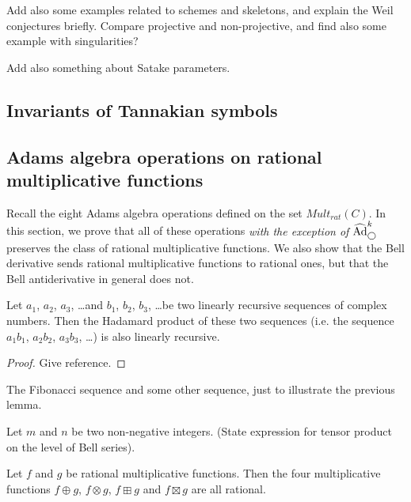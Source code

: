 Add also some examples related to schemes and skeletons, and explain the Weil conjectures briefly. Compare projective and non-projective, and find also some example with singularities?

Add also something about Satake parameters.


\subsection{Invariants of Tannakian symbols}





\subsection{Adams algebra operations on rational multiplicative functions}

Recall the eight Adams algebra operations defined on the set $Mult_{rat}(C)$. In this section, we prove that all of these operations \emph{with the exception of $\widehat{\text{Ad}}^{k}_{\bigcirc}$} preserves the class of rational multiplicative functions. We also show that the Bell derivative sends rational multiplicative functions to rational ones, but that the Bell antiderivative in general does not.

\begin{lemma}
Let $a_1$, $a_2$, $a_3$, \ldots and $b_1$, $b_2$, $b_3$, \ldots be two linearly recursive sequences of complex numbers. Then the Hadamard product of these two sequences (i.e. the sequence $a_1 b_1$, $a_2 b_2$, $a_3 b_3$, \ldots) is also linearly recursive.
\end{lemma}
\begin{proof}
Give reference.
\end{proof}

\begin{example}
The Fibonacci sequence and some other sequence, just to illustrate the previous lemma. 
\end{example}

\begin{lemma}
Let $m$ and $n$ be two non-negative integers. (State expression for tensor product on the level of Bell series).
\end{lemma}

\begin{theorem}

Let $f$ and $g$ be rational multiplicative functions. Then the four multiplicative functions $f \oplus g$, $f \otimes g$, $f \boxplus g$ and $f \boxtimes g$ are all rational.
\end{theorem}


